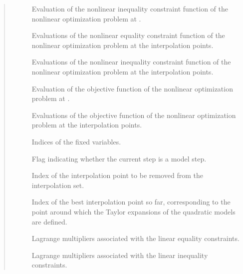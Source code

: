 \documentclass[letterpaper,10pt,english]{sphinxmanual}
\begin{document}
\begin{fulllineitems}
\begin{quote}
\begin{description}
\begin{description}
\item[{}] \leavevmode
\sphinxAtStartPar
Evaluation of the nonlinear inequality constraint function of the nonlinear optimization problem at .

\item[{}] \leavevmode
\sphinxAtStartPar
Evaluations of the nonlinear equality constraint function of the nonlinear optimization problem at the interpolation points.

\item[{}] \leavevmode
\sphinxAtStartPar
Evaluations of the nonlinear inequality constraint function of the nonlinear optimization problem at the interpolation points.

\item[{}] \leavevmode
\sphinxAtStartPar
Evaluation of the objective function of the nonlinear optimization problem at .

\item[{}] \leavevmode
\sphinxAtStartPar
Evaluations of the objective function of the nonlinear optimization problem at the interpolation points.

\item[{}] \leavevmode
\sphinxAtStartPar
Indices of the fixed variables.

\item[{}] \leavevmode
\sphinxAtStartPar
Flag indicating whether the current step is a model step.

\item[{}] \leavevmode
\sphinxAtStartPar
Index of the interpolation point to be removed from the interpolation set.

\item[{}] \leavevmode
\sphinxAtStartPar
Index of the best interpolation point so far, corresponding to the point around which the Taylor expansions of the quadratic models are defined.

\item[{}] \leavevmode
\sphinxAtStartPar
Lagrange multipliers associated with the linear equality constraints.

\item[{}] \leavevmode
\sphinxAtStartPar
Lagrange multipliers associated with the linear inequality constraints.


\end{description}
\end{description}
\end{quote}
\end{fulllineitems}
\end{document}
